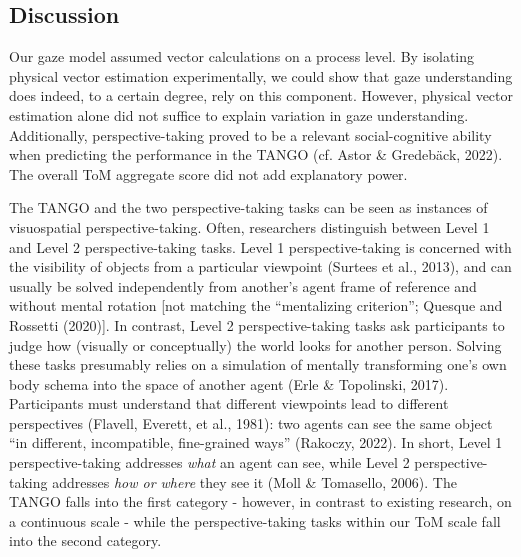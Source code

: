 \documentclass[
  man,mask,floatsintext]{apa7}
\begin{document}
\hypertarget{discussion-2}{%
\subsection{Discussion}\label{discussion-2}}

Our gaze model assumed vector calculations on a process level. By isolating physical vector estimation experimentally, we could show that gaze understanding does indeed, to a certain degree, rely on this component. However, physical vector estimation alone did not suffice to explain variation in gaze understanding. Additionally, perspective-taking proved to be a relevant social-cognitive ability when predicting the performance in the TANGO (cf. Astor \& Gredebäck, 2022). The overall ToM aggregate score did not add explanatory power.

The TANGO and the two perspective-taking tasks can be seen as instances of visuospatial perspective-taking. Often, researchers distinguish between Level 1 and Level 2 perspective-taking tasks. Level 1 perspective-taking is concerned with the visibility of objects from a particular viewpoint (Surtees et al., 2013), and can usually be solved independently from another's agent frame of reference and without mental rotation {[}not matching the ``mentalizing criterion''; Quesque and Rossetti (2020){]}. In contrast, Level 2 perspective-taking tasks ask participants to judge how (visually or conceptually) the world looks for another person. Solving these tasks presumably relies on a simulation of mentally transforming one's own body schema into the space of another agent (Erle \& Topolinski, 2017). Participants must understand that different viewpoints lead to different perspectives (Flavell, Everett, et al., 1981): two agents can see the same object ``in different, incompatible, fine-grained ways'' (Rakoczy, 2022). In short, Level 1 perspective-taking addresses \emph{what} an agent can see, while Level 2 perspective-taking addresses \emph{how or where} they see it (Moll \& Tomasello, 2006). The TANGO falls into the first category - however, in contrast to existing research, on a continuous scale - while the perspective-taking tasks within our ToM scale fall into the second category.
\end{document}
